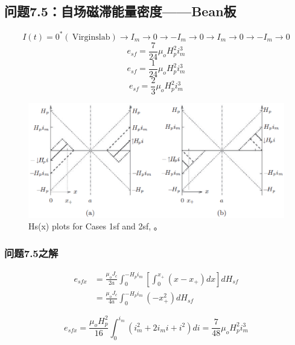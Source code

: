 \subsection{问题7.5：自场磁滞能量密度——Bean板}
\begin{equation}%
I(t)=0^*(\ \mathrm{Virgin slab})\rightarrow I_m\rightarrow 0\rightarrow -I_m\rightarrow 0\rightarrow I_m\rightarrow 0\rightarrow -I_m\rightarrow 0
\end{equation}
\begin{equation}%
e_{sf}=\frac{7}{24}\mu_oH_{p}^{2}i_{m}^{3}
\end{equation}
\begin{equation}%
e_{sf}=\frac{1}{24}\mu_oH_{p}^{2}i_{m}^{3}
\end{equation}
\begin{equation}%
e_{sf}=\frac{2}{3}\mu_oH_{p}^{2}i_{m}^{3}
\end{equation}

\begin{figure}[htbp]
	\centering
	\includegraphics[scale=0.7]{chpt7/figs/fig7.17.eps}
	\caption{Hs(x) plots for Cases 1sf and 2sf, 。}
\end{figure}


\subsubsection{问题7.5之解}
\begin{align*}%
e_{sfx}&=\frac{\mu_oJ_c}{2a}\int_{0}^{-H_pi_m}\left[\int_{0}^{x_+}(x-x_+)dx\right]dH_{sf} \\
&=\frac{\mu_oJ_c}{4a}\int_{0}^{-H_pi_m}(-x_{+}^{2})dH_{sf}
\end{align*}

\begin{equation}%
e_{sfx}=\frac{\mu_oH_{p}^{2}}{16}\int_{0}^{i_m}(i_{m}^{2}+2i_mi+i^2)di 
=\frac{7}{48}\mu_oH_{p}^{2}i_{m}^{3}
\end{equation}

